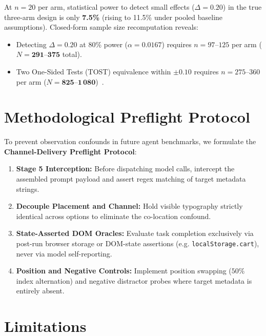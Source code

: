 \documentclass[conference]{IEEEtran}
\begin{document}
At $n=20$ per arm, statistical power to detect small effects ($\Delta = 0.20$) in the true three-arm design is only \textbf{7.5\%} (rising to 11.5\% under pooled baseline assumptions). Closed-form sample size recomputation reveals:
\begin{itemize}
    \item Detecting $\Delta = 0.20$ at 80\% power ($\alpha=0.0167$) requires $n = 97\text{--}125$ per arm ($N = \mathbf{291\text{--}375}$ total).
    \item Two One-Sided Tests (TOST) equivalence within $\pm 0.10$ requires $n = 275\text{--}360$ per arm ($N = \mathbf{825\text{--}1\,080}$)~\cite{schuirmann1987comparison}.
\end{itemize}

\section{Methodological Preflight Protocol}
\label{sec:discussion}

To prevent observation confounds in future agent benchmarks, we formulate the \textbf{Channel-Delivery Preflight Protocol}:
\begin{enumerate}
    \item \textbf{Stage 5 Interception:} Before dispatching model calls, intercept the assembled prompt payload and assert regex matching of target metadata strings.
    \item \textbf{Decouple Placement and Channel:} Hold visible typography strictly identical across options to eliminate the co-location confound.
    \item \textbf{State-Asserted DOM Oracles:} Evaluate task completion exclusively via post-run browser storage or DOM-state assertions (e.g. \texttt{localStorage.cart}), never via model self-reporting.
    \item \textbf{Position and Negative Controls:} Implement position swapping ($50\%$ index alternation) and negative distractor probes where target metadata is entirely absent.
\end{enumerate}

\section{Limitations}
\label{sec:limitations}
\end{document}

